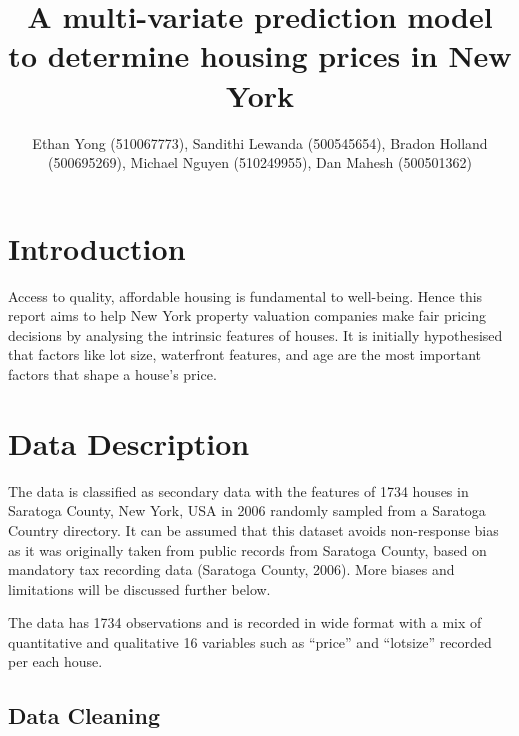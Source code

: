 \documentclass[letterpaper,8pt,twocolumn,twoside,]{pinp}
\title{A multi-variate prediction model to determine housing prices in
New York}
\author[]{Ethan Yong (510067773), Sandithi Lewanda (500545654), Bradon
Holland (500695269), Michael Nguyen (510249955), Dan Mahesh (500501362)}
\begin{document}
\verticaladjustment{-2pt}

\maketitle
\thispagestyle{firststyle}



\hypertarget{introduction}{%
\section{Introduction}\label{introduction}}

Access to quality, affordable housing is fundamental to well-being.
Hence this report aims to help New York property valuation companies
make fair pricing decisions by analysing the intrinsic features of
houses. It is initially hypothesised that factors like lot size,
waterfront features, and age are the most important factors that shape a
house's price.

\hypertarget{data-description}{%
\section{Data Description}\label{data-description}}

The data is classified as secondary data with the features of 1734
houses in Saratoga County, New York, USA in 2006 randomly sampled from a
Saratoga Country directory. It can be assumed that this dataset avoids
non-response bias as it was originally taken from public records from
Saratoga County, based on mandatory tax recording data (Saratoga County,
2006). More biases and limitations will be discussed further below.

The data has 1734 observations and is recorded in wide format with a mix
of quantitative and qualitative 16 variables such as ``price'' and
``lotsize'' recorded per each house.

\hypertarget{data-cleaning}{%
\subsection{Data Cleaning}\label{data-cleaning}}
\end{document}
